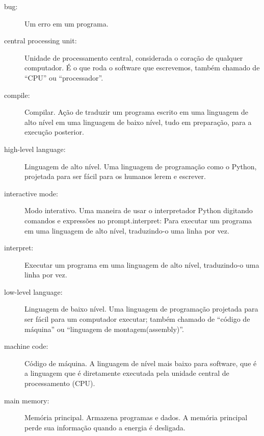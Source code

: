 \begin{description}

\item[bug:]  Um erro em um programa.

\item[central processing unit:]  Unidade de processamento central, considerada o coração de qualquer computador. É o que roda o software que escrevemos, também chamado de ``CPU” ou ``processador”.

\item[compile:]  Compilar. Ação de traduzir um programa escrito em uma linguagem de alto nível em uma linguagem de baixo nível, tudo em preparação, para a execução posterior.

\item[high-level language:]  Linguagem de alto nível. Uma linguagem de programação como o Python, projetada para ser fácil para os humanos lerem e escrever.

\item[interactive mode:]  Modo interativo. Uma maneira de usar o interpretador Python digitando comandos e expressões no prompt.interpret: Para executar um programa em uma linguagem de alto nível, traduzindo-o uma linha por vez.

\item[interpret:]  Executar um programa em uma linguagem de alto nível, traduzindo-o uma linha por vez.

\item[low-level language:]  Linguagem de baixo nível. Uma linguagem de programação projetada para ser fácil para um computador executar; também chamado de ``código de máquina” ou ``linguagem de montagem(assembly)”.

\item[machine code:]  Código de máquina. A linguagem de nível mais baixo para software, que é a linguagem que é diretamente executada pela unidade central de processamento (CPU).

\item[main memory:]  Memória principal. Armazena programas e dados. A memória principal perde sua informação quando a energia é desligada.


\end{description}
